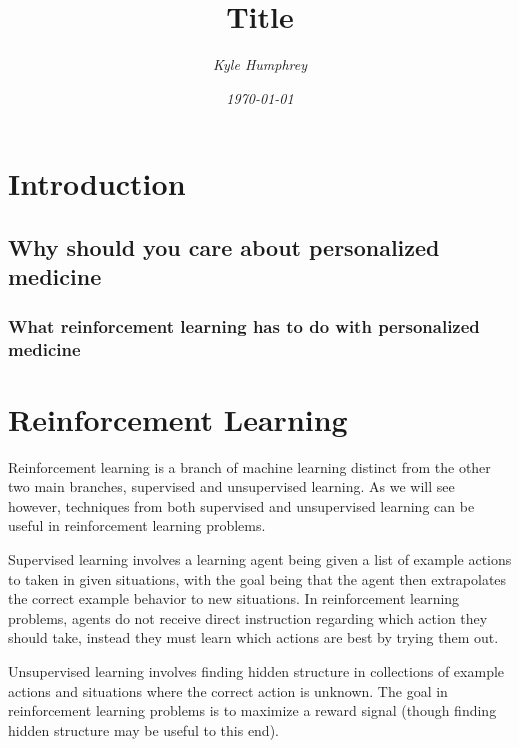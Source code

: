 \documentclass[12pt]{article}
\title{\normalfont \Large Title}
\author{\normalsize \sl Kyle Humphrey}
\date{\normalsize \sl \today}
\begin{document}
\maketitle

\section{Introduction}

\subsection{Why should you care about personalized medicine} %
\label{sub:why_should_you_care_about_personalized_medicine}

\subsubsection{What reinforcement learning has to do with personalized medicine} %
\label{ssub:what_reinforcement_learning_has_to_do_with_personalized_medicine}



\section{Reinforcement Learning} %
\label{sec:reinforcement_learning}


Reinforcement learning is a branch of machine learning distinct from the other two main branches, supervised and unsupervised learning. As we will see however, techniques from both supervised and unsupervised learning can be useful in reinforcement learning problems.

Supervised learning involves a learning agent being given a list of example actions to taken in given situations, with the goal being that the agent then extrapolates the correct example behavior to new situations. In reinforcement learning problems, agents do not receive direct instruction regarding which action they should take, instead they must learn which actions are best by trying them out. 

Unsupervised learning involves finding hidden structure in collections of example actions and situations where the correct action is unknown. The goal in reinforcement learning problems is to maximize a reward signal (though finding hidden structure may be useful to this end).
\end{document}
